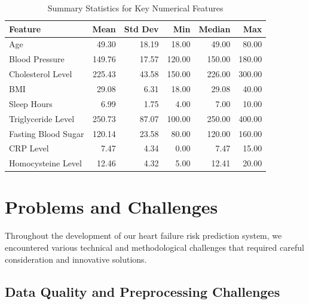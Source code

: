 \documentclass[11pt,a4paper]{article}
\begin{document}
\begin{table}[H]
    \centering
    \caption{Summary Statistics for Key Numerical Features}
    \small
    \begin{tabular}{|l|r|r|r|r|r|}
        \hline
        \textbf{Feature}    & \textbf{Mean} & \textbf{Std Dev} & \textbf{Min} & \textbf{Median} & \textbf{Max} \\
        \hline
        Age                 & 49.30         & 18.19            & 18.00        & 49.00           & 80.00        \\
        Blood Pressure      & 149.76        & 17.57            & 120.00       & 150.00          & 180.00       \\
        Cholesterol Level   & 225.43        & 43.58            & 150.00       & 226.00          & 300.00       \\
        BMI                 & 29.08         & 6.31             & 18.00        & 29.08           & 40.00        \\
        Sleep Hours         & 6.99          & 1.75             & 4.00         & 7.00            & 10.00        \\
        Triglyceride Level  & 250.73        & 87.07            & 100.00       & 250.00          & 400.00       \\
        Fasting Blood Sugar & 120.14        & 23.58            & 80.00        & 120.00          & 160.00       \\
        CRP Level           & 7.47          & 4.34             & 0.00         & 7.47            & 15.00        \\
        Homocysteine Level  & 12.46         & 4.32             & 5.00         & 12.41           & 20.00        \\
        \hline
    \end{tabular}
\end{table}


\section{Problems and Challenges}
Throughout the development of our heart failure risk prediction system, we encountered various technical and methodological challenges that required careful consideration and innovative solutions.

\subsection{Data Quality and Preprocessing Challenges}
\end{document}
